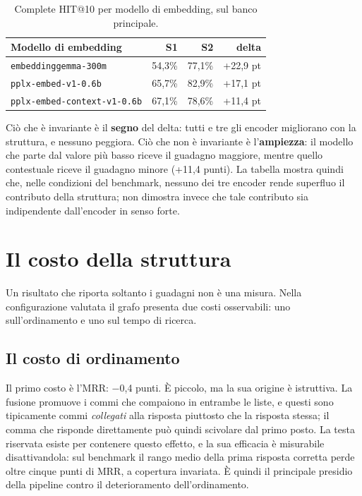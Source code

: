 \begin{table}[H]
    \centering
    \renewcommand{\arraystretch}{1.2}
    \begin{tabular}{|l|r|r|r|}
        \hline
        \textbf{Modello di embedding} & \textbf{S1} & \textbf{S2} & \textbf{delta} \\
        \hline
        \texttt{embeddinggemma-300m} & 54,3\% & 77,1\% & +22,9 pt \\
        \texttt{pplx-embed-v1-0.6b} & 65,7\% & 82,9\% & +17,1 pt \\
        \texttt{pplx-embed-context-v1-0.6b} & 67,1\% & 78,6\% & +11,4 pt \\
        \hline
    \end{tabular}
    \caption{Complete HIT@10 per modello di embedding, sul banco principale.}
    \label{tab:per_modello}
\end{table}

Ciò che è invariante è il \textbf{segno} del delta: tutti e tre gli encoder migliorano con la struttura, e nessuno peggiora. Ciò che non è invariante è l'\textbf{ampiezza}: il modello che parte dal valore più basso riceve il guadagno maggiore, mentre quello contestuale riceve il guadagno minore (+11,4 punti). La tabella mostra quindi che, nelle condizioni del benchmark, nessuno dei tre encoder rende superfluo il contributo della struttura; non dimostra invece che tale contributo sia indipendente dall'encoder in senso forte.

\section{Il costo della struttura}
\label{sec:costo_grafo}

Un risultato che riporta soltanto i guadagni non è una misura. Nella configurazione valutata il grafo presenta due costi osservabili: uno sull'ordinamento e uno sul tempo di ricerca.

\subsection{Il costo di ordinamento}

Il primo costo è l'MRR: $-$0,4 punti. È piccolo, ma la sua origine è istruttiva. La fusione promuove i commi che compaiono in entrambe le liste, e questi sono tipicamente commi \textit{collegati} alla risposta piuttosto che la risposta stessa; il comma che risponde direttamente può quindi scivolare dal primo posto. La testa riservata esiste per contenere questo effetto, e la sua efficacia è misurabile disattivandola: sul benchmark il rango medio della prima risposta corretta perde oltre cinque punti di MRR, a copertura invariata. È quindi il principale presidio della pipeline contro il deterioramento dell'ordinamento.


